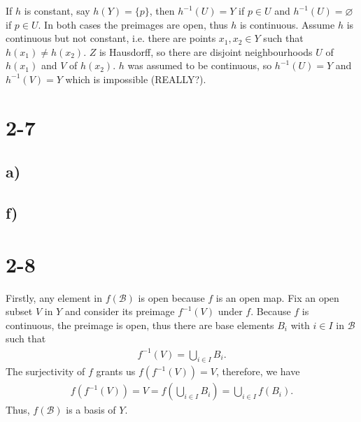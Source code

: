 \documentclass[a4paper]{book}
\theoremstyle{definition}
\begin{document}
If \(h\) is constant, say \(h(Y) = \{p\}\), then \(h^{-1}(U) = Y\) if \(p \in U\) and \(h^{-1}(U) = \varnothing\) if \(p \in U\). In both cases the preimages are open, thus \(h\) is continuous. Assume \(h\) is continuous but not constant, i.e. there are points \(x_1, x_2 \in Y\) such that \(h(x_1) \neq h(x_2)\). \(Z\) is Hausdorff, so there are disjoint neighbourhoods \(U\) of \(h(x_1)\) and \(V\) of \(h(x_2)\). \(h\) was assumed to be continuous, so \(h^{-1}(U) = Y\) and \(h^{-1}(V) = Y\) which is impossible (REALLY?).

\section*{2-7}
\subsection*{a)}


\subsection*{f)}
\section*{2-8}
Firstly, any element in \(f(\mathcal{B})\) is open because \(f\) is an open map. Fix an open subset \(V\) in \(Y\) and consider its preimage \(f^{-1}(V)\) under \(f\). Because \(f\) is continuous, the preimage is open, thus there are base elements \(B_i\) with \(i \in I\) in \(\mathcal{B}\) such that
\begin{align*}
    f^{-1}(V) = \bigcup_{i \in I} B_i \text{.}
\end{align*}
The surjectivity of \(f\) grants us \(f(f^{-1}(V)) = V\), therefore, we have
\begin{align*}
    f(f^{-1}(V)) = V = f \left( \bigcup_{i \in I} B_i \right) = \bigcup_{i \in I} f(B_i)\text{.}
\end{align*}
Thus, \(f(\mathcal{B})\) is a basis of \(Y\).
\end{document}
